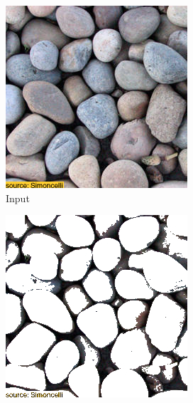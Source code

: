 \begin{figure}[]
\begin{subfigure}{\textwidth}
        \begin{subfigure}{0.24\textwidth}
            \centering
            \includegraphics[width=\textwidth]{images/04-experiment01/pebbles/target.jpg}
            \caption{Input}
            \label{fig:ex01-pebbles-1000steps-threshold_target}
        \end{subfigure}
        \hfill
        \begin{subfigure}{0.24\textwidth}
            \centering
            \includegraphics[width=\textwidth]{images/04-experiment01/pebbles/threshold_bg.jpg}

\end{subfigure}
\end{subfigure}
\end{figure}
